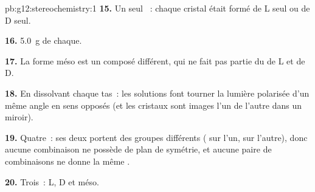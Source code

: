\begin{solution}{pb:g12:stereochemistry:1}
\textbf{15.} Un seul ~: chaque cristal était formé de L seul
ou de D seul.

\textbf{16.} \qty{5.0}{g} de chaque.

\textbf{17.} La forme méso est un composé différent, qui ne fait pas
partie du  de L et de D.

\textbf{18.} En dissolvant chaque tas~: les solutions font tourner la
lumière polarisée d'un même angle en sens opposés (et les cristaux sont
images l'un de l'autre dans un miroir).

\textbf{19.} Quatre~: ses deux  portent des groupes
différents ( sur l'un,  sur l'autre), donc aucune
combinaison ne possède de plan de symétrie, et aucune paire de
combinaisons ne donne la même .

\textbf{20.} Trois~: L, D et méso.
\end{solution}
